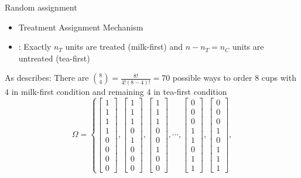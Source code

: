\documentclass[table, xcolor = {dvipsnames}, 9pt]{beamer}
\theoremstyle{plain}
\newcommand{\mh}[1]{{\color{magenta}{#1}}}
\begin{document}
\begin{frame}{Random assignment}
\vfill
\begin{itemize} \vfill
  \item Treatment Assignment Mechanism \vfill
  \item[] \mh{Complete randomization}: Exactly $n_T$ units are treated (milk-first) and $n - n_T = n_C$ units are untreated (tea-first) \vfill
  \end{itemize} \vfill
As \citet{fisher1935a} describes: There are $\binom{8}{4} = \frac{8!}{4!(8 - 4)!} = 70$ possible ways to order $8$ cups with $4$ in milk-first condition and remaining $4$ in tea-first condition \vfill
\begin{equation}
\Omega = \left\{
\begin{bmatrix} 1 \\ 1 \\ 1 \\ 1 \\ 0 \\ 0 \\ 0 \\ 0 \end{bmatrix},
\begin{bmatrix} 1 \\ 1 \\ 1 \\ 0 \\ 1 \\ 0 \\ 0 \\ 0 \end{bmatrix},
\begin{bmatrix} 1 \\ 1 \\ 1 \\ 0 \\ 0 \\ 1 \\ 0 \\ 0 \end{bmatrix},
\cdots ,
\begin{bmatrix} 0 \\ 0 \\ 0 \\ 1 \\ 1 \\ 0 \\ 1 \\ 1 \end{bmatrix},
\begin{bmatrix} 0 \\ 0 \\ 0 \\ 1 \\ 0 \\ 1 \\ 1 \\ 1 \end{bmatrix},

\end{equation}
\end{frame}
\end{document}
